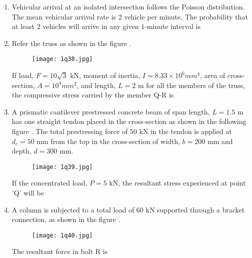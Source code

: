 \documentclass[journal,12pt,onecolumn]{article}
\theoremstyle{remark}
\begin{document}
\begin{enumerate}
\hfill{}

\item Vehicular arrival at an isolated intersection follows the Poisson distribution. The mean vehicular arrival rate is 2 vehicle per minute. The probability  that at least $2$ vehicles will arrive in any given $1$-minute interval is \underline{\hspace{2cm}}

\hfill{}

\item Refer the truss as shown in the figure  .
\begin{figure}[H]
    \centering
    \texttt{[image: 1q38.jpg]}
    \caption{}
    \label{fig:q38}
\end{figure}
If load, $F = 10\sqrt{3}$ kN, moment of inertia, $I = 8.33 \times 10^6 mm^4$, area of cross-section, $A = 10^4 mm^2$, and length, $L = 2$ m for all the members of the truss, the compressive stress  carried by the member Q-R is \underline{\hspace{2cm}}

\hfill{}

\item A prismatic cantilever prestressed concrete beam of span length, $L=1.5$ m has one straight tendon placed in the cross-section as shown in the following figure  . The total prestressing force of $50$ kN in the tendon is applied at $d_c = 50$ mm from the top in the cross-section of width, $b = 200$ mm and depth, $d = 300$ mm.
\begin{figure}[H]
    \centering
    \texttt{[image: 1q39.jpg]}
    \caption{}
    \label{fig:q39}
\end{figure}
If the concentrated load, $P = 5$ kN, the resultant stress  experienced at point 'Q' will be \underline{\hspace{2cm}}

\hfill{}

\item A column is subjected to a total load  of $60$ kN supported through a bracket connection, as shown in the figure .
\begin{figure}[H]
    \centering
    \texttt{[image: 1q40.jpg]}
    \caption{}
    \label{fig:q40}
\end{figure}
The resultant force in bolt R  is \underline{\hspace{2cm}}


\end{enumerate}
\end{document}
